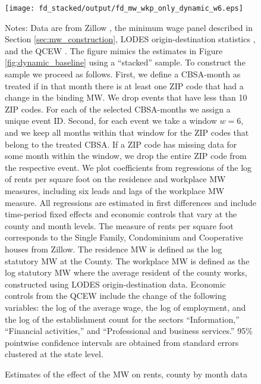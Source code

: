
\begin{figure}[h!]
    \centering
    \caption{Estimates of the effect of the MW on rents, county by month data}
    \label{fig:dynamic_stacked}

	\texttt{[image: fd\_stacked/output/fd\_mw\_wkp\_only\_dynamic\_w6.eps]}

    \begin{minipage}{.95\textwidth} \footnotesize
        \vspace{3mm}
        Notes:
        Data are from Zillow \parencite{ZillowData}, 
        the minimum wage panel described in Section \ref{sec:mw_construction}, 
        LODES origin-destination statistics \parencite{CensusLODES},
        and the QCEW \parencite{QCEW}.
        The figure mimics the estimates in Figure \ref{fig:dynamic_baseline} using a 
        ``stacked'' sample.
        To construct the sample we proceed as follows.
        First, we define a CBSA-month as treated if in that month there is at 
        least one ZIP code that had a change in the binding MW.
        We drop events that have less than 10 ZIP codes.
        For each of the selected CBSA-months we assign a unique event ID. 
        Second, for each event we take a window $w = 6$, and we keep all months 
        within that window for the ZIP codes that belong to the treated CBSA.
        If a ZIP code has missing data for some month within the window, we drop 
        the entire ZIP code from the respective event.
        We plot coefficients from regressions of the log of rents per
        square foot on the residence and workplace MW measures, including 
        six leads and lags of the workplace MW measure.
        All regressions are estimated in first differences and include 
        time-period fixed effects and economic controls that vary at the 
        county and month levels.
        The measure of rents per square foot corresponds to the Single Family, 
        Condominium and Cooperative houses from Zillow.
        The residence MW is defined as the log statutory MW at the County.
        The workplace MW is defined as the log statutory MW where the average 
        resident of the county works, constructed using LODES 
        origin-destination data.
        Economic controls from the QCEW include the change of the following 
        variables: the log of the average wage, the log of employment, and the 
        log of the establishment count for the sectors ``Information,'' 
        ``Financial activities,'' and ``Professional and business services.''
        95\% pointwise confidence intervals are obtained from standard errors 
        clustered at the state level.
    \end{minipage}
\end{figure}
